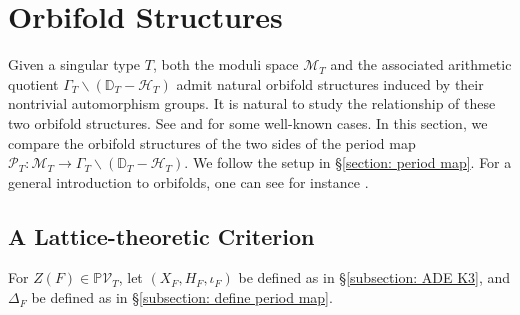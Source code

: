 \documentclass[12pt,reqno,a4paper]{amsart}
\newtheorem{lem}[thm]{Lemma~}
\theoremstyle{remark}
\theoremstyle{definition}
\newcommand{\CC}{\mathbb{C}}
\newcommand{\PP}{\mathbb{P}}
\newcommand{\DD}{\mathbb{D}}
\newcommand{\Prd}{\mathscr{P}}
\newcommand{\calH}{\mathcal{H}}
\newcommand{\calM}{\mathcal{M}}
\newcommand{\calV}{\mathcal{V}}
\newcommand{\bs}{\backslash}
\newcommand{\red}{\textcolor{red}}
\begin{document}









\section{Orbifold Structures}
\label{sec: orbifold structures}
Given a singular type $T$, both the moduli space $\calM_T$ and the associated arithmetic quotient $\Gamma_T\bs(\DD_T-\calH_T)$ admit natural orbifold structures induced by their nontrivial automorphism groups. It is natural to study the relationship of these two orbifold structures. See \cite{kudla2012occult} and \cite{zheng2021orbifold} for some well-known cases. In this section, we compare the orbifold structures of the two sides of the period map $\Prd_T\colon \calM_T\to \Gamma_T\bs(\DD_T-\calH_T)$.
We follow the setup in \S \ref{section: period map}.
For a general introduction to orbifolds, one can see for instance \cite[Chapter 13]{thurston2022geometry}.

\subsection{A Lattice-theoretic Criterion}
For $Z(F)\in \PP\calV_T$, let $(X_F,H_F,\iota_F)$ be defined as in \S \ref{subsection: ADE K3}, and $\Delta_F$ be defined as in \S \ref{subsection: define period map}.

    
\end{document}
